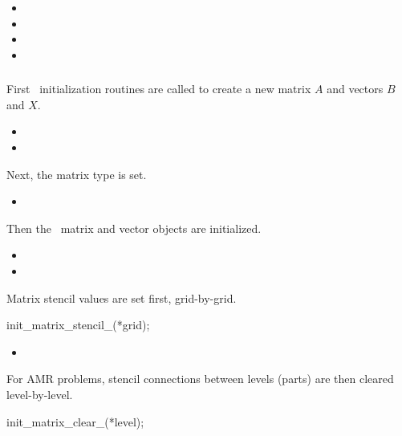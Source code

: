 \documentclass[10pt]{article}
\begin{document}
\begin{itemize}
\item {}
\item {}
\item {}
\item {}
\end{itemize}

\subsubsection{}

First \hypre\ initialization routines are called to create
a new matrix $A$ and vectors $B$ and $X$.

\begin{itemize}
\item {}
\item {}
\end{itemize}

Next, the matrix type is set.

\begin{itemize}
\item {}
\end{itemize}

Then the \hypre\ matrix and vector objects are initialized.

\begin{itemize}
\item {}
\item {}
\end{itemize}

Matrix stencil values are set first, grid-by-grid.

      init\_matrix\_stencil\_(*grid);

\begin{itemize}
\item {}
\end{itemize}

For AMR problems, stencil connections between levels (parts) are then
cleared level-by-level.

    init\_matrix\_clear\_(*level);
\end{document}
